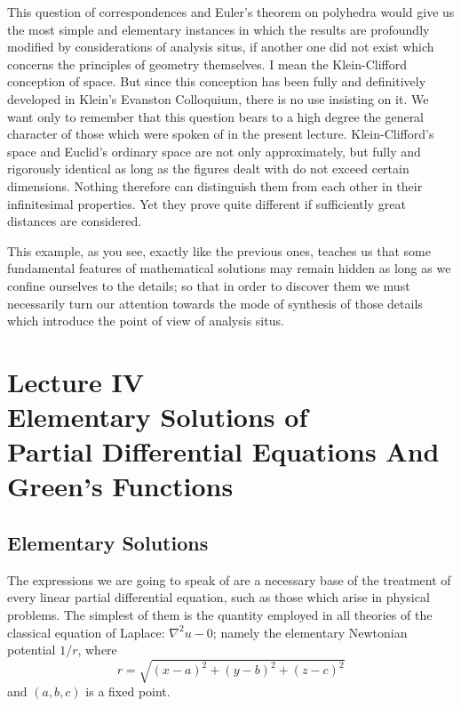 \documentclass[12pt,oneside]{book}
\begin{document}
This question of correspondences and Euler's theorem on polyhedra would give us
the most simple and elementary instances in which the results are profoundly
modified by considerations of analysis situs, if another one did not exist which
concerns the principles of geometry themselves. I mean the Klein-Clifford
conception of space. But since this conception has been fully and definitively
developed in Klein's Evanston Colloquium, there is no use insisting on it. We
want only to remember that this question bears to a high degree the general
character of those which were spoken of in the present lecture. Klein-Clifford's
space and Euclid's ordinary space are not only approximately, but fully and
rigorously identical as long as the figures dealt with do not exceed certain
dimensions. Nothing therefore can distinguish them from each other in their
infinitesimal properties. Yet they prove quite different if sufficiently great
distances are considered. \par

This example, as you see, exactly like the previous ones, teaches us that some
fundamental features of mathematical solutions may remain hidden as long as we
confine ourselves to the details; so that in order to discover them we must
necessarily turn our attention towards the mode of synthesis of those details
which introduce the point of view of analysis situs. \par

\chapter[Lecture IV]{Lecture IV\\Elementary Solutions of\\Partial Differential
Equations And\\Green's Functions}

\section{Elementary Solutions}

The expressions we are going to speak of are a necessary base of the treatment
of every linear partial differential equation, such as those which arise in
physical problems. The simplest of them is the quantity employed in all theories
of the classical equation of Laplace: $\nabla^2u-0$; namely the elementary
Newtonian potential $1/r$, where
$$r=\sqrt{(x-a)^2+(y-b)^2+(z-c)^2}$$
and $(a,b,c)$ is a fixed point. \par
\end{document}
